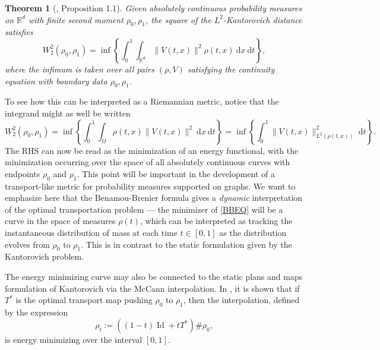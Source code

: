 \documentclass{article}
\DeclareMathOperator*{\Id}{Id}
\newtheorem{theorem}{Theorem}
\newcommand{\R}{\mathbb{R}}
\newcommand{\diff}{\:\mathrm{d}}
\begin{document}
\begin{theorem}[\cite{benamouComputationalFluidMechanics2000}, Proposition 1.1]
  \label{BBF}
  Given absolutely continuous probability measures on \(\R^d\) with finite second moment \(\rho_0, \rho_1\), the square of the \(L^2\)-Kantorovich distance satisfies
  \begin{equation*}
	W_2^2(\rho_0,\rho_1) = \inf \left\{ \int_{0}^1\int_{\R^d}\|V(t,x)\|^2\rho(t,x) \diff x \diff t \right\},
  \end{equation*}
where the infimum is taken over all pairs \((\rho, V)\) satisfying the continuity equation with boundary data \(\rho_0, \rho_1\).
\end{theorem}

To see how this can be interpreted as a Riemannian metric, notice that the integrand might as well be written
\begin{equation}
  W_2^2(\rho_0, \rho_1) = \inf \left\{ \int_0^1 \int_\Omega \rho(t,x)\|V(t,x)\|^2 \diff x \diff t \right\} = \inf \left\{ \int_0^1 \|V(t,x)\|_{L^2(\rho(t,x))}^2 \diff t \right\}.
\label{BBEQ}
\end{equation}
The RHS can now be read as the minimization of an energy functional, with the minimization occurring over the space of all absolutely continuous curves with endpoints \(\rho_0\) and \(\rho_1\). This point will be important in the development of a transport-like metric for probability measures supported on graphs. We want to emphasize here that the Benamou-Brenier formula gives a \emph{dynamic} interpretation of the optimal transportation problem --- the minimizer of \eqref{BBEQ} will be a curve in the space of measures \(\rho(t)\), which can be interpreted as tracking the instantaneous distribution of mass at each time \(t \in [0,1]\) as the distribution evolves from \(\rho_0\) to \(\rho_1\). This is in contrast to the static formulation given by the Kantorovich problem.

The energy minimizing curve may also be connected to the static plans and maps formulation of Kantorovich via the McCann interpolation. In \cite{mccannConvexityPrincipleInteracting1997}, it is shown that if \(T^*\) is the optimal transport map pushing \(\rho_0\) to \(\rho_1\), then the interpolation, defined by the expression
\begin{equation*}
    \rho_t := ((1-t)\Id + tT^*)\#\rho_0,
\end{equation*}
is energy minimizing over the interval \([0,1]\).
\end{document}
